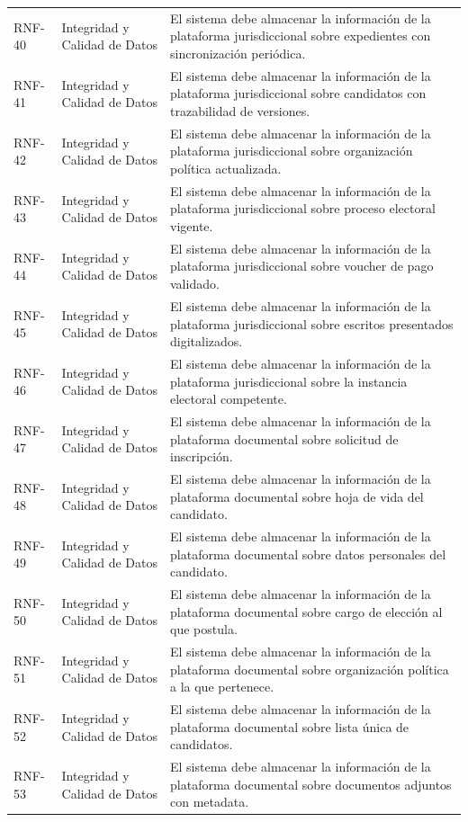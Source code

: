 \documentclass[12pt,a4paper,oneside]{book}
\begin{document}
\begin{longtable}{@{}>{\centering\arraybackslash}p{2cm}
                    >{\centering\arraybackslash}p{3cm}
                    >{\raggedright\arraybackslash}p{10cm}@{}}
RNF-40 & Integridad y Calidad de Datos & El sistema debe almacenar la información de la plataforma jurisdiccional sobre expedientes con sincronización periódica. \\
RNF-41 & Integridad y Calidad de Datos & El sistema debe almacenar la información de la plataforma jurisdiccional sobre candidatos con trazabilidad de versiones. \\
RNF-42 & Integridad y Calidad de Datos & El sistema debe almacenar la información de la plataforma jurisdiccional sobre organización política actualizada. \\
RNF-43 & Integridad y Calidad de Datos & El sistema debe almacenar la información de la plataforma jurisdiccional sobre proceso electoral vigente. \\
RNF-44 & Integridad y Calidad de Datos & El sistema debe almacenar la información de la plataforma jurisdiccional sobre voucher de pago validado. \\
RNF-45 & Integridad y Calidad de Datos & El sistema debe almacenar la información de la plataforma jurisdiccional sobre escritos presentados digitalizados. \\
RNF-46 & Integridad y Calidad de Datos & El sistema debe almacenar la información de la plataforma jurisdiccional sobre la instancia electoral competente. \\
RNF-47 & Integridad y Calidad de Datos & El sistema debe almacenar la información de la plataforma documental sobre solicitud de inscripción. \\
RNF-48 & Integridad y Calidad de Datos & El sistema debe almacenar la información de la plataforma documental sobre hoja de vida del candidato. \\
RNF-49 & Integridad y Calidad de Datos & El sistema debe almacenar la información de la plataforma documental sobre datos personales del candidato. \\
RNF-50 & Integridad y Calidad de Datos & El sistema debe almacenar la información de la plataforma documental sobre cargo de elección al que postula. \\
RNF-51 & Integridad y Calidad de Datos & El sistema debe almacenar la información de la plataforma documental sobre organización política a la que pertenece. \\
RNF-52 & Integridad y Calidad de Datos & El sistema debe almacenar la información de la plataforma documental sobre lista única de candidatos. \\
RNF-53 & Integridad y Calidad de Datos & El sistema debe almacenar la información de la plataforma documental sobre documentos adjuntos con metadata. \\

\end{longtable}
\end{document}
